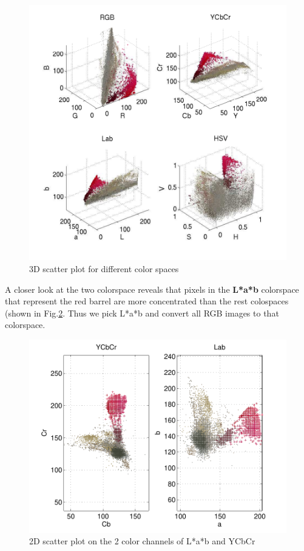 \documentclass[twoside]{article}
\begin{document}
\begin{multicols}{2}
\begin{figure}[H]
  \centering
  \includegraphics[width=\columnwidth]{cspace.pdf}
    \caption{3D scatter plot for different color spaces}
    \label{fig:cspace}
\end{figure}

A closer look at the two colorspace reveals that pixels in the \textbf{L*a*b} colorspace that represent the red barrel are more concentrated than the rest colospaces (shown in Fig.\ref{fig:cspace_2d}. Thus we pick L*a*b and convert all RGB images to that colorspace. 

\begin{figure}[H]
  \centering
  \includegraphics[width=\columnwidth]{cspace_2d.pdf}
    \caption{2D scatter plot on the 2 color channels of L*a*b and YCbCr}
    \label{fig:cspace_2d}
\end{figure}


\end{multicols}
\end{document}
